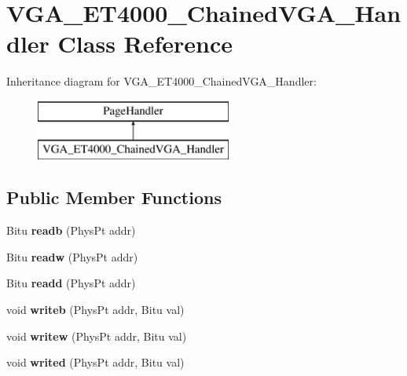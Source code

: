 \hypertarget{classVGA__ET4000__ChainedVGA__Handler}{\section{V\-G\-A\-\_\-\-E\-T4000\-\_\-\-Chained\-V\-G\-A\-\_\-\-Handler Class Reference}
\label{classVGA__ET4000__ChainedVGA__Handler}
}
Inheritance diagram for V\-G\-A\-\_\-\-E\-T4000\-\_\-\-Chained\-V\-G\-A\-\_\-\-Handler\-:\begin{figure}[H]
\begin{center}
\leavevmode
\includegraphics[height=2.000000cm]{classVGA__ET4000__ChainedVGA__Handler}
\end{center}
\end{figure}
\subsection*{Public Member Functions}
\begin{DoxyCompactItemize}
\item 
\hypertarget{classVGA__ET4000__ChainedVGA__Handler_a43b8deb7f2757e00e81eedbba20d4014}{Bitu {\bfseries readb} (Phys\-Pt addr)}\label{classVGA__ET4000__ChainedVGA__Handler_a43b8deb7f2757e00e81eedbba20d4014}

\item 
\hypertarget{classVGA__ET4000__ChainedVGA__Handler_a32fb4cc9290e1b4f889860c3188e9ec4}{Bitu {\bfseries readw} (Phys\-Pt addr)}\label{classVGA__ET4000__ChainedVGA__Handler_a32fb4cc9290e1b4f889860c3188e9ec4}

\item 
\hypertarget{classVGA__ET4000__ChainedVGA__Handler_add770a36ac59399da32baf948a05601b}{Bitu {\bfseries readd} (Phys\-Pt addr)}\label{classVGA__ET4000__ChainedVGA__Handler_add770a36ac59399da32baf948a05601b}

\item 
\hypertarget{classVGA__ET4000__ChainedVGA__Handler_a2f4d16d803cbf6f72437116d4761cb4b}{void {\bfseries writeb} (Phys\-Pt addr, Bitu val)}\label{classVGA__ET4000__ChainedVGA__Handler_a2f4d16d803cbf6f72437116d4761cb4b}

\item 
\hypertarget{classVGA__ET4000__ChainedVGA__Handler_af1f3aebaef2e265a7cb60c0d957ea021}{void {\bfseries writew} (Phys\-Pt addr, Bitu val)}\label{classVGA__ET4000__ChainedVGA__Handler_af1f3aebaef2e265a7cb60c0d957ea021}

\item 
\hypertarget{classVGA__ET4000__ChainedVGA__Handler_a9a9ae6e33886901185eae5c860459668}{void {\bfseries writed} (Phys\-Pt addr, Bitu val)}\label{classVGA__ET4000__ChainedVGA__Handler_a9a9ae6e33886901185eae5c860459668}

\end{DoxyCompactItemize}
